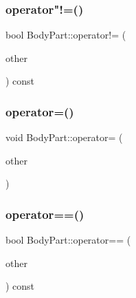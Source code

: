 \mbox{\label{class_body_part_aa5df801cc11333d0adeaa5235c70bc7c}} 
\subsubsection{\texorpdfstring{operator"!=()}{operator!=()}}
{\footnotesize\ttfamily bool Body\+Part\+::operator!= (\begin{DoxyParamCaption}\item[{\mbox{\hyperlink{class_body_part}{Body\+Part}} \&}]{other }\end{DoxyParamCaption}) const}

\mbox{\label{class_body_part_af4df2320cea8651ff589a57778ba4eee}} 
\subsubsection{\texorpdfstring{operator=()}{operator=()}}
{\footnotesize\ttfamily void Body\+Part\+::operator= (\begin{DoxyParamCaption}\item[{const \mbox{\hyperlink{class_body_part}{Body\+Part}} \&}]{other }\end{DoxyParamCaption})}

\mbox{\label{class_body_part_a9fa30957d2740122ef8d3bf1905c2dda}} 
\subsubsection{\texorpdfstring{operator==()}{operator==()}}
{\footnotesize\ttfamily bool Body\+Part\+::operator== (\begin{DoxyParamCaption}\item[{\mbox{\hyperlink{class_body_part}{Body\+Part}} \&}]{other }\end{DoxyParamCaption}) const}

\mbox{\label{class_body_part_a089afe1bbd06d3fc84a9870ec173883c}} 
